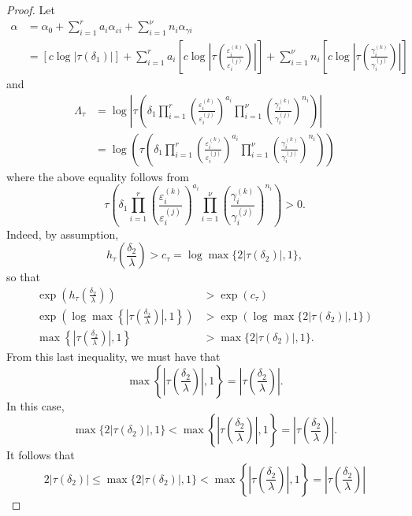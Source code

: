 \begin{proof}
Let 
\begin{align*}
\alpha	
	& = \alpha_0+\sum_{i = 1}^r a_i \alpha_{\varepsilon i} + \sum_{i = 1}^{\nu} n_i \alpha_{\gamma i}\\
	& = [c\log|\tau(\delta_1)|] +\sum_{i = 1}^r a_i \left[c\log\left|\tau\left(\frac{\varepsilon_i^{(k)}}{\varepsilon_i^{(j)}}\right)\right|\right] + \sum_{i = 1}^{\nu} n_i \left[c\log\left|\tau\left(\frac{\gamma_i^{(k)}}{\gamma_i^{(j)}}\right)\right|\right]
\end{align*}
and
\begin{align*}
\Lambda_{\tau} &= \log\left|\tau\left(\delta_1 \prod_{i = 1}^r\left( \frac{\varepsilon_i^{(k)}}{\varepsilon_i^{(j)}}\right)^{a_i}\prod_{i = 1}^{\nu} \left( \frac{\gamma_i^{(k)}}{\gamma_i^{(j)}}\right)^{n_i}\right)\right|\\
&= \log\left(\tau\left(\delta_1 \prod_{i = 1}^r\left( \frac{\varepsilon_i^{(k)}}{\varepsilon_i^{(j)}}\right)^{a_i}\prod_{i = 1}^{\nu} \left( \frac{\gamma_i^{(k)}}{\gamma_i^{(j)}}\right)^{n_i}\right)\right)
\end{align*}
where the above equality follows from 
\[\tau\left(\delta_1 \prod_{i = 1}^r\left( \frac{\varepsilon_i^{(k)}}{\varepsilon_i^{(j)}}\right)^{a_i}\prod_{i = 1}^{\nu} \left( \frac{\gamma_i^{(k)}}{\gamma_i^{(j)}}\right)^{n_i}\right) > 0.\]
Indeed, by assumption,
\[ h_{\tau}\left(\frac{\delta_2}{\lambda}\right) > c_\tau = \log \max\{2|\tau(\delta_2)|,1\},\]
so that 
\begin{align*}
\exp\left(h_{\tau}\left(\frac{\delta_2}{\lambda}\right)\right)	& > \exp(c_{\tau}) \\
\exp\left(\log \max \left\{ \left|\tau\left(\frac{\delta_2}{\lambda}\right)\right|, 1\right\}\right) & > \exp \left(\log \max\{2|\tau(\delta_2)|,1\}\right)\\
\max \left\{ \left|\tau\left(\frac{\delta_2}{\lambda}\right)\right|, 1\right\} & > \max\{2|\tau(\delta_2)|,1\}.
\end{align*}
From this last inequality, we must have that 
\[\max \left\{ \left|\tau\left(\frac{\delta_2}{\lambda}\right)\right|, 1\right\} = \left|\tau\left(\frac{\delta_2}{\lambda}\right)\right|.\]
In this case, 
\[\max\{2|\tau(\delta_2)|,1\} < \max \left\{ \left|\tau\left(\frac{\delta_2}{\lambda}\right)\right|, 1\right\} = \left|\tau\left(\frac{\delta_2}{\lambda}\right)\right|.\]
It follows that
\[2|\tau(\delta_2)| \leq \max\{2|\tau(\delta_2)|,1\} < \max \left\{ \left|\tau\left(\frac{\delta_2}{\lambda}\right)\right|, 1\right\} = \left|\tau\left(\frac{\delta_2}{\lambda}\right)\right|\]

\end{proof}
